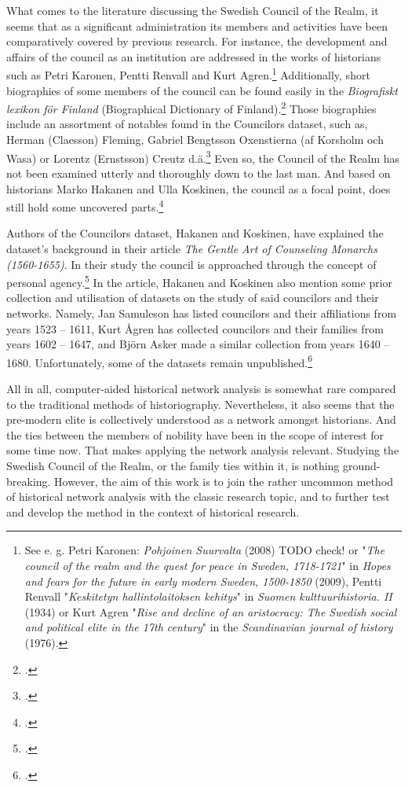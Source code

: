 \documentclass[a4paper,12pt]{article}
\begin{document}
\begin{onehalfspace}
What comes to the literature discussing the Swedish Council of the Realm, it seems that as a significant administration its members and activities have been comparatively covered by previous research. For instance, the development and affairs of the council as an institution are addressed in the works of historians such as Petri Karonen, Pentti Renvall and Kurt Agren.\footnote{See e. g. Petri Karonen: \textit{Pohjoinen Suurvalta} (2008) TODO check! or "\textit{The council of the realm and the quest for peace in Sweden, 1718-1721}" in \textit{Hopes and fears for the future in early modern Sweden, 1500-1850} (2009), Pentti Renvall "\textit{Keskitetyn hallintolaitoksen kehitys}" in \textit{Suomen kulttuurihistoria. II} (1934) or Kurt Agren "\textit{Rise and decline of an aristocracy: The Swedish social and political elite in the 17th century}" in the \textit{Scandinavian journal of history} (1976).} Additionally, short biographies of some members of the council can be found easily in the \textit{Biografiskt lexikon för Finland} (Biographical Dictionary of Finland).\footcite{blf} Those biographies include an assortment of notables found in the Councilors dataset, such as, Herman (Claesson) Fleming, Gabriel Bengtsson Oxenstierna (af Korsholm och Wasa) or Lorentz (Ernstsson) Creutz d.ä.\footcite{blf-list} Even so, the Council of the Realm has not been examined utterly and thoroughly down to the last man. And based on historians Marko Hakanen and Ulla Koskinen, the council as a focal point, does still hold some uncovered parts.\footcite[p. 47-48.]{HakanenAKoskinen2017} 

Authors of the Councilors dataset, Hakanen and Koskinen, have explained the dataset's background in their article \textit{The Gentle Art of Counseling Monarchs (1560-1655)}. In their study the council is approached through the concept of personal agency.\footcite{HakanenAKoskinen2017} In the article, Hakanen and Koskinen also mention some prior collection and utilisation of datasets on the study of said councilors and their networks. Namely, Jan Samuleson has listed councilors and their affiliations from years 1523 – 1611, Kurt Ågren has collected councilors and their families from years 1602 – 1647, and Björn Asker made a similar collection from years 1640 – 1680. Unfortunately, some of the datasets remain unpublished.\footcite[p. 48, 67 (cite 4).]{HakanenAKoskinen2017} 

All in all, computer-aided historical network analysis is somewhat rare compared to the traditional methods of historiography. Nevertheless, it also seems that the pre-modern elite is collectively understood as a network amongst historians. And the ties between the members of nobility have been in the scope of interest for some time now. That makes applying the network analysis relevant. Studying the Swedish Council of the Realm, or the family ties within it, is nothing ground-breaking. However, the aim of this work is to join the rather uncommon method of historical network analysis with the classic research topic, and to further test and develop the method in the context of historical research.

\printbibliography
\end{onehalfspace}
\end{document}
